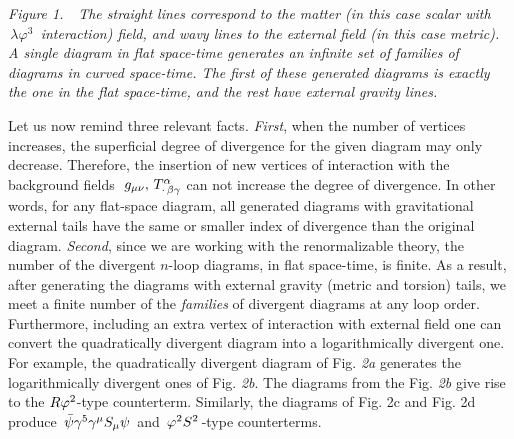 \noindent
{\small\it Figure 1. $\,\,$ 
The straight lines correspond to the matter (in this case scalar with 
$\,\lambda\varphi^3\,$ 
interaction) field, and wavy lines to the external 
field (in this case metric). A single diagram in flat space-time
generates an infinite set of families of diagrams in curved space-time.
The first of these generated diagrams is exactly the one in the
flat space-time, and the rest have external gravity lines.}
\vskip 1mm

Let us now remind three relevant facts. 
{\large\it First}, 
when the number of 
vertices increases, the superficial degree of divergence
for the given diagram may only decrease. Therefore, the 
insertion of new vertices of interaction with the background 
fields 
$\,\,g_{\mu\nu},\,T^\alpha_{\cdot\,\beta\gamma}$ can not increase 
the degree
of divergence. In other words, for any flat-space diagram, 
all generated diagrams with gravitational external tails 
have the same or smaller index of divergence than the original 
diagram. 
{\large\it Second}, since we are working with the 
renormalizable theory, the number of the divergent $n$-loop 
diagrams, in flat space-time, is finite. 
As a result, after generating the diagrams with external 
gravity (metric and torsion) tails, we meet a finite number 
of the {\it families} of divergent diagrams at any loop order. 
Furthermore, 
including an extra vertex of interaction with 
external field one can convert the quadratically divergent 
diagram into a logarithmically divergent one. For example, 
the quadratically divergent diagram of Fig. {\it 2a} generates
the logarithmically divergent ones of Fig. {\it 2b}. The
diagrams from the  Fig. {\it 2b} give rise to the 
$R\varphi^2$-type counterterm. Similarly, the diagrams 
of Fig. 2c and Fig. 2d produce
 $\,{\bar \psi}\gamma^5\gamma^\mu S_\mu \psi\,$ and $\,\varphi^2S^2\,$-type
counterterms.

